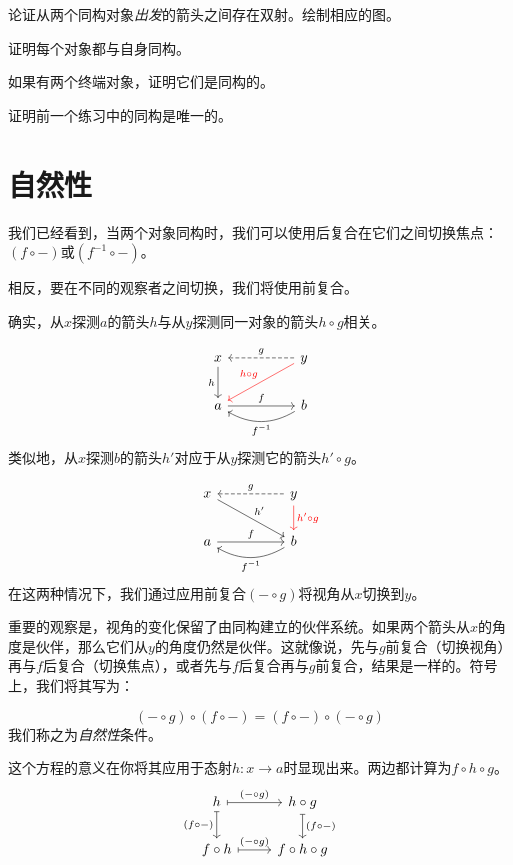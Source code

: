 \documentclass[DaoFP]{subfiles}
\begin{document}
\begin{exercise}
论证从两个同构对象\emph{出发}的箭头之间存在双射。绘制相应的图。
\end{exercise}


\begin{exercise}
证明每个对象都与自身同构。
\end{exercise}

\begin{exercise}
如果有两个终端对象，证明它们是同构的。
\end{exercise}

\begin{exercise}
证明前一个练习中的同构是唯一的。
\end{exercise}

\section{自然性}

我们已经看到，当两个对象同构时，我们可以使用后复合在它们之间切换焦点：$(f \circ -)$或$(f^{-1} \circ -)$。

相反，要在不同的观察者之间切换，我们将使用前复合。

确实，从$x$探测$a$的箭头$h$与从$y$探测同一对象的箭头$h\circ g$相关。

\[
 \begin{tikzcd}
 x
 \arrow[d, "h"']
 && y
 \arrow[ll, dashed, "g"']
  \arrow[dll, red, "h \circ g"']
 \\
 a
 \arrow[rr, "f"]
  && b
 \arrow[ll, bend left,  "f^{-1}"]
 \end{tikzcd}
\]
类似地，从$x$探测$b$的箭头$h'$对应于从$y$探测它的箭头$h' \circ g$。

\[
 \begin{tikzcd}
 x
 \arrow[drr, "h'"]
 && y
 \arrow[ll, dashed, "g"']
  \arrow[d, red, "h' \circ g"]
 \\
 a
 \arrow[rr, "f"]
  && b
 \arrow[ll, bend left,  "f^{-1}"]
 \end{tikzcd}
\]
在这两种情况下，我们通过应用前复合$(- \circ g)$将视角从$x$切换到$y$。

重要的观察是，视角的变化保留了由同构建立的伙伴系统。如果两个箭头从$x$的角度是伙伴，那么它们从$y$的角度仍然是伙伴。这就像说，先与$g$前复合（切换视角）再与$f$后复合（切换焦点），或者先与$f$后复合再与$g$前复合，结果是一样的。符号上，我们将其写为：

\[(- \circ g) \circ (f \circ -) = (f \circ -) \circ (- \circ g)\]
我们称之为\emph{自然性}条件。

这个方程的意义在你将其应用于态射$h \colon x \to a$时显现出来。两边都计算为$f \circ h \circ g$。
\[
 \begin{tikzcd}
 h
 \arrow[r, mapsto, "(- \circ g)"]
 \arrow[d, mapsto, "(f \circ -)"']
 & h \circ g
 \arrow[d, mapsto, "(f \circ -)"]
 \\
 f \circ h
 \arrow[r, mapsto, "(- \circ g)"]
& f \circ h \circ g
 \end{tikzcd}
\]
\end{document}

